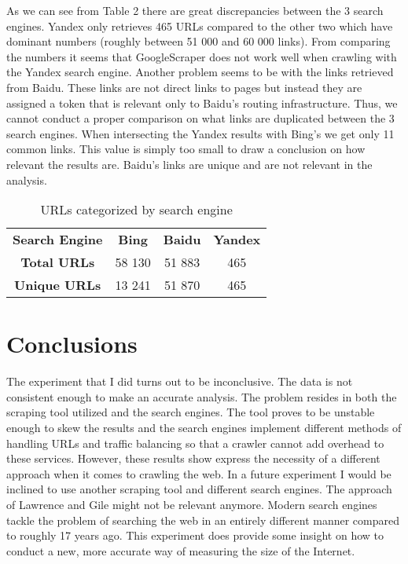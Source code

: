\documentclass{sig-alternate}
\begin{document}
As we can see from Table 2 there are great discrepancies between the 3 search engines. Yandex only retrieves 465 URLs compared to the other two which have dominant numbers (roughly between 51 000 and 60 000 links). From comparing the numbers it seems that GoogleScraper does not work well when crawling with the Yandex search engine. Another problem seems to be with the links retrieved from Baidu. These links are not direct links to pages but instead they are assigned a token that is relevant only to Baidu's routing infrastructure. Thus, we cannot conduct a proper comparison on what links are duplicated between the 3 search engines. When intersecting the Yandex results with Bing's we get only 11 common links. This value is simply too small to draw a conclusion on how relevant the results are. Baidu's links are unique and are not relevant in the analysis.

\begin{table}[h]
\centering
\begin{tabular}{|c|c|c|c|}
\hline
\rowcolor[HTML]{343434} 
{\color[HTML]{FFFFFF} \textbf{Search Engine}} & {\color[HTML]{FFFFFF} \textbf{Bing}} & {\color[HTML]{FFFFFF} \textbf{Baidu}} & {\color[HTML]{FFFFFF} \textbf{Yandex}} \\
\textbf{Total URLs}                           & 58 130                               & 51 883                                & 465                                    \\ \hline
\textbf{Unique URLs}                          & 13 241                               & 51 870                                 & 465                                  \\ \hline 
\end{tabular}
\caption{URLs categorized by search engine}
\end{table}



\section{Conclusions}
The experiment that I did turns out to be inconclusive. The data is not consistent enough to make an accurate analysis. The problem resides in both the scraping tool utilized and the search engines. The tool proves to be unstable enough to skew the results and the search engines implement different methods of handling URLs and traffic balancing so that a crawler cannot add overhead to these services. However, these results show express the necessity of a different approach when it comes to crawling the web. In a future experiment I would be inclined to use another scraping tool and different search engines. The approach of  Lawrence and Gile might not be relevant anymore. Modern search engines tackle the problem of searching the web in an entirely different manner compared to roughly 17 years ago. This experiment does provide some insight on how to conduct a new, more accurate way of measuring the size of the Internet.
\end{document}
